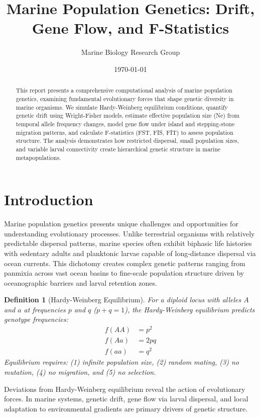 \documentclass[11pt,a4paper]{article}
\title{Marine Population Genetics: Drift, Gene Flow, and F-Statistics}
\author{Marine Biology Research Group}
\date{\today}
\newtheorem{definition}{Definition}[section]
\begin{document}
\maketitle

\begin{abstract}
This report presents a comprehensive computational analysis of marine population genetics, examining
fundamental evolutionary forces that shape genetic diversity in marine organisms. We simulate
Hardy-Weinberg equilibrium conditions, quantify genetic drift using Wright-Fisher models,
estimate effective population size (Ne) from temporal allele frequency changes, model gene flow
under island and stepping-stone migration patterns, and calculate F-statistics (FST, FIS, FIT) to
assess population structure. The analysis demonstrates how restricted dispersal, small population
sizes, and variable larval connectivity create hierarchical genetic structure in marine metapopulations.
\end{abstract}

\section{Introduction}

Marine population genetics presents unique challenges and opportunities for understanding evolutionary
processes. Unlike terrestrial organisms with relatively predictable dispersal patterns, marine species
often exhibit biphasic life histories with sedentary adults and planktonic larvae capable of long-distance
dispersal via ocean currents. This dichotomy creates complex genetic patterns ranging from panmixia
across vast ocean basins to fine-scale population structure driven by oceanographic barriers and larval
retention zones.

\begin{definition}[Hardy-Weinberg Equilibrium]
For a diploid locus with alleles $A$ and $a$ at frequencies $p$ and $q$ ($p + q = 1$), the
Hardy-Weinberg equilibrium predicts genotype frequencies:
\begin{align}
f(AA) &= p^2 \\
f(Aa) &= 2pq \\
f(aa) &= q^2
\end{align}
Equilibrium requires: (1) infinite population size, (2) random mating, (3) no mutation,
(4) no migration, and (5) no selection.
\end{definition}

Deviations from Hardy-Weinberg equilibrium reveal the action of evolutionary forces. In marine systems,
genetic drift, gene flow via larval dispersal, and local adaptation to environmental gradients are
primary drivers of genetic structure.
\end{document}
